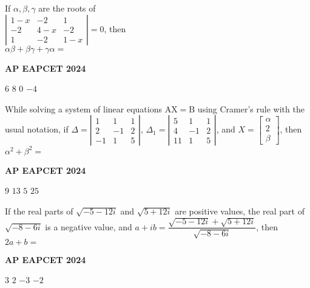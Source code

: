 \documentclass[11pt,paper=a4,answers]{exam}
\begin{document}
\begin{multicols}{2}
\begin{questions}
\question
If $\alpha, \beta, \gamma$ are the roots of \\ $\left|\begin{array}{ccc}
1-x & -2 & 1 \\
-2 & 4-x & -2 \\
1 & -2 & 1-x
\end{array}\right| = 0$, then \\ $\alpha \beta + \beta \gamma + \gamma \alpha =$
\begin{flushright}
\small\textbf{AP EAPCET 2024}
\end{flushright}
\begin{choices}
  \choice $6$ 
  \choice $8$ 
  \choice $0$ 
  \choice $-4$ 
\end{choices}


\question
While solving a system of linear equations $\mathrm{AX} = \mathrm{B}$ using Cramer's rule with the usual notation, if $\Delta = \left|\begin{array}{ccc}
1 & 1 & 1 \\
2 & -1 & 2 \\
-1 & 1 & 5
\end{array}\right|$, $\Delta_1 = \left|\begin{array}{ccc}
5 & 1 & 1 \\
4 & -1 & 2 \\
11 & 1 & 5
\end{array}\right|$, and $X = \begin{bmatrix} \alpha \\ 2 \\ \beta \end{bmatrix}$, then $\alpha^2 + \beta^2 =$
\begin{flushright}
\small\textbf{AP EAPCET 2024}
\end{flushright}
\begin{choices}
  \choice $9$ 
  \choice $13$ 
  \choice $5$ 
  \choice $25$ 
\end{choices}

\question
If the real parts of $\sqrt{-5-12i}$ and $\sqrt{5+12i}$ are positive values, the real part of $\sqrt{-8-6i}$ is a negative value, and $a + ib = \dfrac{\sqrt{-5-12i} + \sqrt{5+12i}}{\sqrt{-8-6i}}$, then $2a + b =$
\begin{flushright}
\small\textbf{AP EAPCET 2024}
\end{flushright}
\begin{choices}
  \choice $3$ 
  \choice $2$ 
  \choice $-3$ 
  \choice $-2$ 
\end{choices}






\end{questions}
\end{multicols}
\end{document}
